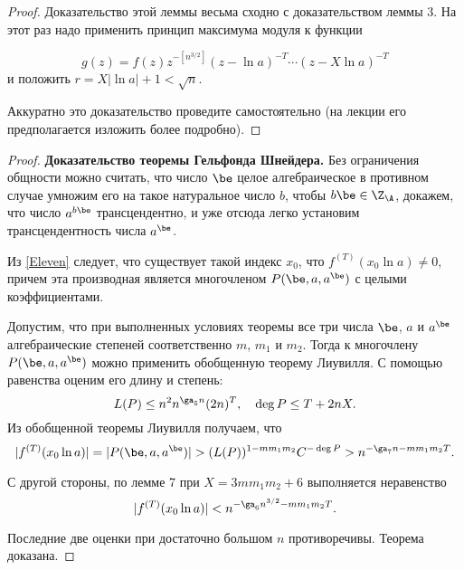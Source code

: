 \documentclass{article}
\begin{document}
\begin{proof}
Доказательство этой леммы весьма сходно с доказательством леммы 3. На этот
раз надо применить принцип максимума модуля к функции

$$
g(z)=f(z)z^{-[n^{3/2}]}(z-\ln a)^{-T} \cdots (z-X\ln a)^{-T}
$$
и положить $r=X|\ln a|+1<\sqrt n$.

Аккуратно это доказательство проведите самостоятельно (на лекции его
предполагается изложить более подробно).
\end{proof}

\begin{proof} \textbf{Доказательство теоремы Гельфонда Шнейдера.} Без ограничения общности
можно считать, что число $\be$ целое алгебраическое в противном случае
умножим его на такое натуральное число $b$,  чтобы
$b\be \in \Z_{\A}$,  докажем, что число $a^{b\be}$ трансцендентно,
и уже отсюда легко установим трансцендентность числа $a^{\be}$.

Из \eqref{Eleven} следует, что существует
такой индекс $x_0$, что $f^{(T)}(x_0\ln a) \ne 0$, причем эта производная является
многочленом $P(\be, a, a^{\be})$ с целыми коэффициентами.

Допустим, что при выполненных условиях теоремы все три числа
$\be$, $a$   и $a^{\be}$  алгебраические степеней
соответственно $m$, $m_1$ и  $m_2$. Тогда
к многочлену $P(\be, a, a^{\be}) $ можно применить обобщенную теорему
Лиувилля. С помощью равенства  оценим его длину и степень:
$$
L(P) \le n^2n^{\ga_5n}(2n)^T, \quad \deg P \le T+2nX.
$$
Из обобщенной теоремы Лиувилля получаем, что
$$
|f^{(T)}(x_0\ln a)|=|P(\be, a, a^{\be})|> (L(P))^{1-mm_1m_2}C^{-\deg P} >
n^{-\ga_7n-mm_1m_2T}.
$$

С другой стороны, по лемме 7 при $X=3mm_1m_2+6$ выполняется неравенство
$$
|f^{(T)}(x_0\ln a)| <n^{-\ga_6n^{3/2}-mm_1m_2T}.
$$

Последние две оценки при достаточно большом $n$ противоречивы. Теорема
доказана.
\end{proof}
\end{document}
